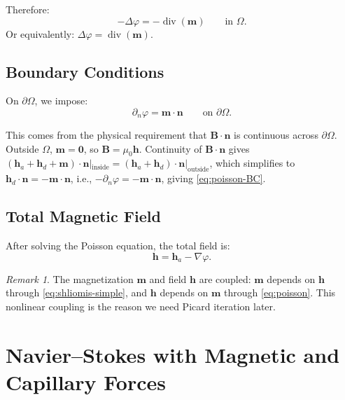 \documentclass[11pt,a4paper]{article}
\theoremstyle{definition}
\theoremstyle{remark}
\newtheorem{remark}[proposition]{Remark}
\newcommand{\dn}{\partial_n}
\newcommand{\dv}{\operatorname{div}}
\newcommand{\grad}{\nabla}
\newcommand{\bfm}{\bm{m}}
\newcommand{\bfh}{\bm{h}}
\newcommand{\bfn}{\bm{n}}
\newcommand{\bfB}{\bm{B}}
\begin{document}
Therefore:
\begin{equation}
  \label{eq:poisson}
  \boxed{
    -\Delta\varphi = -\dv(\bfm) \qquad \text{in } \Omega.
  }
\end{equation}
Or equivalently: $\Delta\varphi = \dv(\bfm)$.

\subsection{Boundary Conditions}

On $\partial\Omega$, we impose:
\begin{equation}
  \label{eq:poisson-BC}
  \dn\varphi = \bfm \cdot \bfn \qquad \text{on } \partial\Omega.
\end{equation}

\begin{derivnote}
This comes from the physical requirement that
$\bfB \cdot \bfn$ is continuous across $\partial\Omega$. Outside
$\Omega$, $\bfm = \bm{0}$, so $\bfB = \mu_0\bfh$. Continuity of
$\bfB \cdot \bfn$ gives
$(\bfh_a + \bfh_d + \bfm) \cdot \bfn |_{\text{inside}}
= (\bfh_a + \bfh_d) \cdot \bfn|_{\text{outside}}$,
which simplifies to $\bfh_d \cdot \bfn = -\bfm \cdot \bfn$, i.e.,
$-\dn\varphi = -\bfm \cdot \bfn$, giving \eqref{eq:poisson-BC}.
\end{derivnote}

\subsection{Total Magnetic Field}

After solving the Poisson equation, the total field is:
\begin{equation}
  \label{eq:total-h}
  \bfh = \bfh_a - \grad\varphi.
\end{equation}

\begin{remark}
  The magnetization $\bfm$ and field $\bfh$ are coupled:
  $\bfm$ depends on $\bfh$ through \eqref{eq:shliomis-simple}, and
  $\bfh$ depends on $\bfm$ through \eqref{eq:poisson}. This nonlinear
  coupling is the reason we need Picard iteration later.
\end{remark}


\section{Navier--Stokes with Magnetic and Capillary Forces}
\label{sec:NS}
\end{document}
